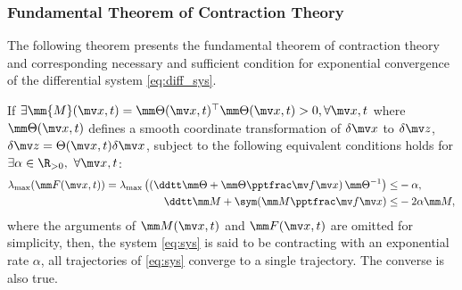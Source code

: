 \subsubsection{Fundamental Theorem of Contraction Theory}

The following theorem presents the fundamental theorem of contraction theory and corresponding necessary and sufficient condition for exponential convergence of the differential system \eqref{eq:diff_sys}.

\begin{theorem}
    If $
        \exists \mm{M}(\bdx,t)
        =
        \mm\Theta(\bdx,t)^\top
        \mm\Theta(\bdx,t)
        > 0, \forall \bdx,t
    $ where $\mm\Theta(\bdx,t)$ defines a smooth coordinate transformation of $\delta\bdx$ to $\delta\bdz$, \ie $\delta\bdz = \Theta(\bdx,t)\delta\bdx$, subject to the following equivalent conditions holds for $\exists\alpha\in\R_{>0},\ \forall \bdx,t$:
    \begin{subequations}
        \begin{align}
            \lambda_{\max} (
                \mm F(\bdx,t)
            )
            =
            \lambda_{\max} 
            \left(
                \left(    
                \ddtt \mm\Theta
                +
                \mm\Theta\tpfpx
                \right)
                \mm\Theta^{-1}
            \right)
            \le&
            -\alpha
            ,
        \label{eq:ctrac:metric:F}
            \\
            \ddtt \mm M
            +
            \sym(\mm M\tpfpx)
            \le&
            -2\alpha\mm M
            ,
        \label{eq:ctrac:metric:M}
        \end{align}
        \label{eq:ctrac:metric}
    \end{subequations}
    where the arguments of $\mm M(\bdx,t)$ and $\mm F(\bdx,t)$ are omitted for simplicity, then, the system \eqref{eq:sys} is said to be contracting with an exponential rate $\alpha$, \ie all trajectories of \eqref{eq:sys} converge to a single trajectory.
    The converse is also true.
    \label{thm:ctrac:main}
\end{theorem}

